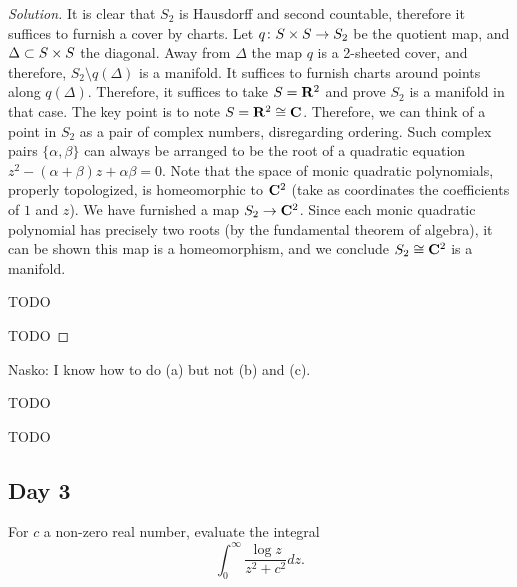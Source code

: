 \begin{proof}[Solution]
  It is clear that $S_2$ is Hausdorff and second countable, therefore it suffices to furnish a cover by charts. Let $q \colon S \times S \rightarrow S_2$ be the quotient map, and $\Delta \subset S \times S$ the diagonal. Away from $\Delta$ the map $q$ is a 2-sheeted cover, and therefore, $S_2 \setminus q(\Delta)$ is a manifold. It suffices to furnish charts around points along $q(\Delta)$. Therefore, it suffices to take $S = \mathbf{R}^2$ and prove $S_2$ is a manifold in that case. The key point is to note $S = \mathbf{R}^2 \cong \mathbf{C}$. Therefore, we can think of a point in $S_2$ as a pair of complex numbers, disregarding ordering. Such complex pairs $\{\alpha,\beta\}$ can always be arranged to be the root of a quadratic equation $z^2 - (\alpha+\beta)z + \alpha\beta = 0$. Note that the space of monic quadratic polynomials, properly topologized, is homeomorphic to $\mathbf{C}^2$ (take as coordinates the coefficients of $1$ and $z$). We have furnished a map $S_2 \rightarrow \mathbf{C}^2$. Since each monic quadratic polynomial has precisely two roots (by the fundamental theorem of algebra), it can be shown this map is a homeomorphism, and we conclude $S_2 \cong \mathbf{C}^2$ is a manifold.
  
  TODO
  
  TODO
\end{proof}

Nasko: I know how to do (a) but not (b) and (c).


TODO


TODO

\subsection{Day 3}
\label{S:spring-2008-3}
\mbox{}


For $c$ a non-zero real number, evaluate the integral
\[
\int_0^\infty \frac{\log z}{z^2 + c^2} d z.
\]

